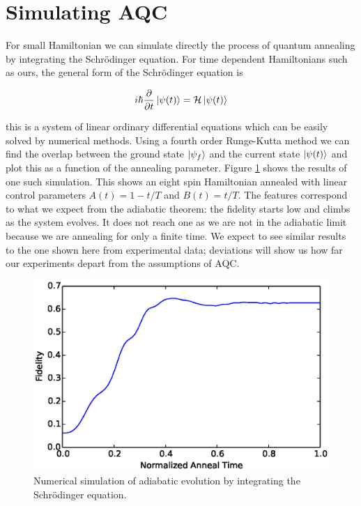 \section{Simulating AQC}
For small Hamiltonian we can simulate directly the process of quantum annealing by integrating the Schr\"odinger equation. For time dependent Hamiltonians such as ours, the general form of the Schr\"odinger equation is 

\begin{equation}
	i\hbar\frac{\partial}{\partial t} \mathinner{|{\psi(t)}\rangle} = \mathcal{H}\mathinner{|{\psi(t)}\rangle}
\end{equation}

this is a system of linear ordinary differential equations which can be easily solved by numerical methods.  Using a fourth order Runge-Kutta method\cite{comp_book} we can find the overlap between the ground state $\mathinner{|{\psi_f}\rangle}$ and the current state $\mathinner{|{\psi(t)}\rangle}$ and plot this as a function of the annealing parameter.  Figure \ref{fig:simulate} shows the results of one such simulation.  This shows an eight spin Hamiltonian annealed with linear control parameters $A(t) = 1-t/T$ and $B(t) = t/T$.  The features correspond to what we expect from the adiabatic theorem: the fidelity starts low and climbs as the system evolves.  It does not reach one as we are not in the adiabatic limit because we are annealing for only a finite time.  We expect to see similar results to the one shown here from experimental data; deviations will show us how far our experiments depart from the assumptions of AQC.
\begin{figure}
	\includegraphics{img/simulate.eps}
	\caption[Simulated AQC]{Numerical simulation of adiabatic evolution by integrating the Schr\"odinger equation.}
	\label{fig:simulate}
\end{figure}
